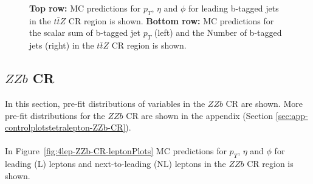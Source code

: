 \begin{figure}[htbp]
    \caption{\textbf{Top row:} MC predictions for $p_{T}$, $\eta$ and $\phi$ for leading b-tagged jets in the $t\bar{t}Z$ CR region  is shown. \textbf{Bottom row:} MC predictions for the scalar sum of b-tagged jet $p_{T}$ (left) and the Number of b-tagged jets (right) in the $t\bar{t}Z$ CR region  is shown.}
  \label{fig:4lep-ttZ-CR-bjetPlots}
\end{figure}




\subsection{$ZZb$ CR}
\label{sec:controlplotstetralepton-ZZb-CR}


In this section, pre-fit distributions of variables in the $ZZb$ CR are shown. More pre-fit distributions for the $ZZb$ CR are shown in the appendix (Section \ref{sec:app-controlplotstetralepton-ZZb-CR}).\\\\

In Figure~\ref{fig:4lep-ZZb-CR-leptonPlots} MC predictions for $p_{T}$, $\eta$ and $\phi$ for leading (L) leptons and next-to-leading (NL) leptons in the $ZZb$ CR region is shown.

